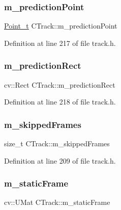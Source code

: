 \subsubsection{\texorpdfstring{m\+\_\+prediction\+Point}{m\_predictionPoint}}
{\footnotesize\ttfamily \mbox{\hyperlink{defines_8h_a8c42696da8f098b91374a8e8bb84b430}{Point\+\_\+t}} C\+Track\+::m\+\_\+prediction\+Point\hspace{0.3cm}{\ttfamily [private]}}



Definition at line 217 of file track.\+h.

\mbox{\label{class_c_track_aeab9c3c95a6d988918f5874a8910b90b}} 
\subsubsection{\texorpdfstring{m\+\_\+prediction\+Rect}{m\_predictionRect}}
{\footnotesize\ttfamily cv\+::\+Rect C\+Track\+::m\+\_\+prediction\+Rect\hspace{0.3cm}{\ttfamily [private]}}



Definition at line 218 of file track.\+h.

\mbox{\label{class_c_track_a3308a34b70a90692b0fb863eb621bd37}} 
\subsubsection{\texorpdfstring{m\+\_\+skipped\+Frames}{m\_skippedFrames}}
{\footnotesize\ttfamily size\+\_\+t C\+Track\+::m\+\_\+skipped\+Frames}



Definition at line 209 of file track.\+h.

\mbox{\label{class_c_track_a87bfcad44f8da34b2411733ed5ddcbae}} 
\subsubsection{\texorpdfstring{m\+\_\+static\+Frame}{m\_staticFrame}}
{\footnotesize\ttfamily cv\+::\+U\+Mat C\+Track\+::m\+\_\+static\+Frame\hspace{0.3cm}{\ttfamily [private]}}



